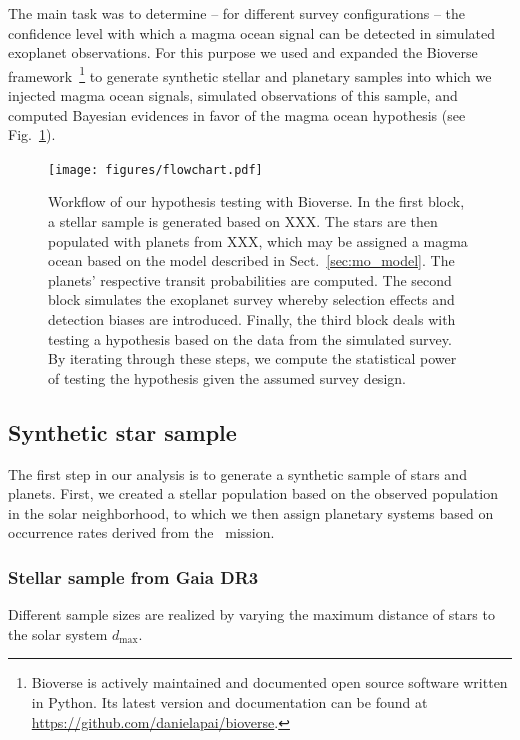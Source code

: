 \documentclass[modern]{aastex631}
\begin{document}
The main task was to determine -- for different survey configurations -- the confidence level with which a magma ocean signal can be detected in simulated exoplanet observations.
For this purpose we used and expanded the Bioverse framework~\citep{Bixel2020,Bixel2021}\footnote{Bioverse is actively maintained and documented open source software written in Python. Its latest version and documentation can be found at \url{https://github.com/danielapai/bioverse}.} to generate synthetic stellar and planetary samples into which we injected magma ocean signals, simulated observations of this sample, and computed Bayesian evidences in favor of the magma ocean hypothesis (see Fig.~\ref{fig:flowchart}).
\begin{figure}
    \begin{centering}
        \texttt{[image: figures/flowchart.pdf]}
        \caption{Workflow of our hypothesis testing with Bioverse. In the first block, a stellar sample is generated based on XXX. The stars are then populated with planets from XXX, which may be assigned a magma ocean based on the model described in Sect.~\ref{sec:mo_model}. The planets' respective transit probabilities are computed. The second block simulates the exoplanet survey whereby selection effects and detection biases are introduced. Finally, the third block deals with testing a hypothesis based on the data from the simulated survey. By iterating through these steps, we compute the statistical power of testing the hypothesis given the assumed survey design.}
        \label{fig:flowchart}
    \end{centering}
\end{figure}


\subsection{Synthetic star sample}
The first step in our analysis is to generate a synthetic sample of stars and planets.
First, we created a stellar population based on the observed population in the solar neighborhood, to which we then assign planetary systems based on occurrence rates derived from the \kepler\ mission.

\subsubsection{Stellar sample from Gaia DR3}
Different sample sizes are realized by varying the maximum distance of stars to the solar system $d_\mathrm{max}$.
\end{document}
